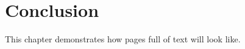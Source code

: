
\chapter{Conclusion}
\label{chap:conclusion}

This chapter demonstrates how pages full of text will look like.





